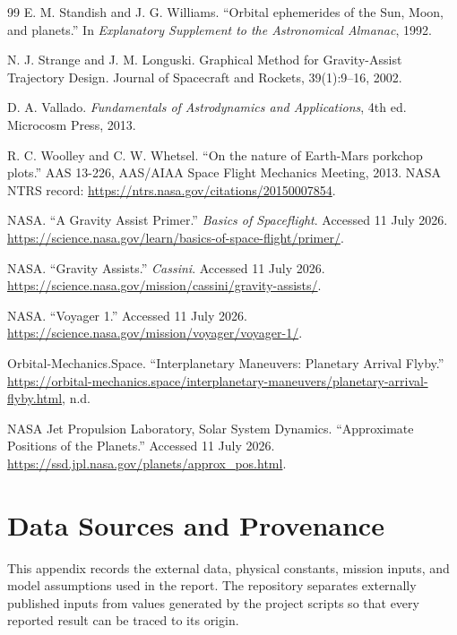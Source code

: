\documentclass[11pt,a4paper]{article}
\begin{document}
\begin{thebibliography}{99}
E. M. Standish and J. G. Williams. ``Orbital ephemerides of the Sun, Moon, and
planets.'' In \emph{Explanatory Supplement to the Astronomical Almanac}, 1992.

 N. J. Strange and J. M. Longuski. Graphical Method for Gravity-Assist Trajectory Design. Journal of Spacecraft and Rockets, 39(1):9–16, 2002.

D. A. Vallado. \emph{Fundamentals of Astrodynamics and Applications}, 4th ed.
Microcosm Press, 2013.

R. C. Woolley and C. W. Whetsel. ``On the nature of Earth-Mars porkchop
plots.'' AAS 13-226, AAS/AIAA Space Flight Mechanics Meeting, 2013. NASA
NTRS record: \url{https://ntrs.nasa.gov/citations/20150007854}.

NASA. ``A Gravity Assist Primer.'' \emph{Basics of Spaceflight}. Accessed 11 July 2026.
\url{https://science.nasa.gov/learn/basics-of-space-flight/primer/}.

NASA. ``Gravity Assists.'' \emph{Cassini}. Accessed 11 July 2026.
\url{https://science.nasa.gov/mission/cassini/gravity-assists/}.

NASA. ``Voyager 1.'' Accessed 11 July 2026.
\url{https://science.nasa.gov/mission/voyager/voyager-1/}.

Orbital-Mechanics.Space. ``Interplanetary Maneuvers: Planetary Arrival Flyby.''
\url{https://orbital-mechanics.space/interplanetary-maneuvers/planetary-arrival-flyby.html}, n.d.

NASA Jet Propulsion Laboratory, Solar System Dynamics. ``Approximate Positions of the Planets.'' Accessed 11 July 2026.
\url{https://ssd.jpl.nasa.gov/planets/approx_pos.html}.

\end{thebibliography}

\clearpage
\appendix

\section{Data Sources and Provenance}
\label{app:data-sources}

This appendix records the external data, physical constants, mission inputs,
and model assumptions used in the report. The repository separates externally
published inputs from values generated by the project scripts so that every
reported result can be traced to its origin.
\end{document}
